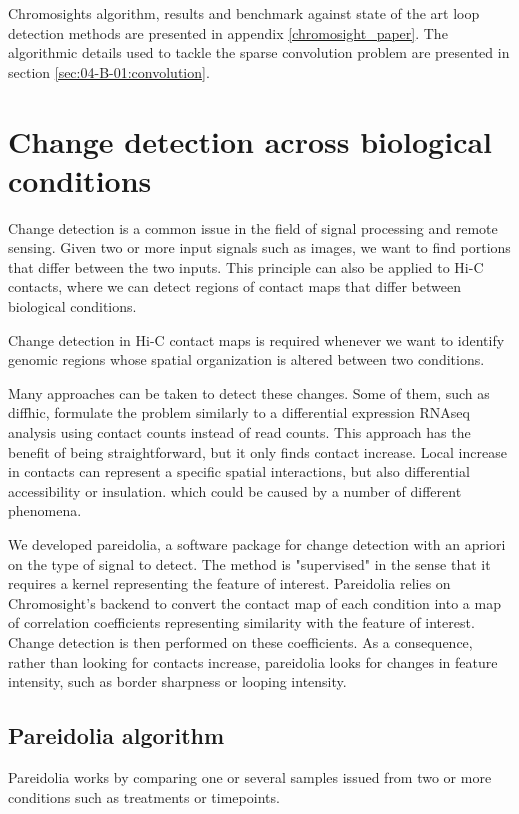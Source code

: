 Chromosights algorithm, results and benchmark against state of the art loop detection methods are presented in appendix \ref{chromosight_paper}. The algorithmic details used to tackle the sparse convolution problem are presented in section \ref{sec:04-B-01:convolution}.


\section{Change detection across biological conditions}

Change detection is a common issue in the field of signal processing and remote sensing. Given two or more input signals such as images, we want to find portions that differ between the two inputs. This principle can also be applied to Hi-C contacts, where we can detect regions of contact maps that differ between biological conditions.

Change detection in Hi-C contact maps is required whenever we want to identify genomic regions whose spatial organization is altered between two conditions.

Many approaches can be taken to detect these changes. Some of them, such as diffhic, formulate the problem similarly to a differential expression RNAseq analysis using contact counts instead of read counts. This approach has the benefit of being straightforward, but it only finds contact increase. Local increase in contacts can represent a specific spatial interactions, but also differential accessibility or insulation. which could be caused by a number of different phenomena.

We developed pareidolia, a software package for change detection with an apriori on the type of signal to detect. The method is "supervised" in the sense that it requires a kernel representing the feature of interest. Pareidolia relies on Chromosight's backend to convert the contact map of each condition into a map of correlation coefficients representing similarity with the feature of interest. Change detection is then performed on these coefficients. As a consequence, rather than looking for contacts increase, pareidolia looks for changes in feature intensity, such as border sharpness or looping intensity.

\subsection{Pareidolia algorithm}

Pareidolia works by comparing one or several samples issued from two or more conditions such as treatments or timepoints.

